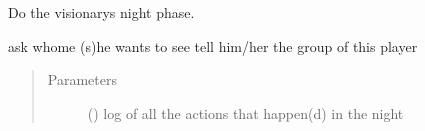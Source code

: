 \documentclass[letterpaper,10pt,english]{sphinxmanual}
\begin{document}
\begin{fulllineitems}
\begin{fulllineitems}
Do the visionarys night phase.

ask whome (s)he wants to see
tell him/her the group of this player
\begin{quote}\begin{description}
\item[{Parameters}] \leavevmode
{} ({\hyperref[\detokenize{chatwolf:chatwolf.nightactions.Nightactions}]{}}) \textendash{} log of all the actions that happen(d) in the night

\end{description}\end{quote}

\end{fulllineitems}


\end{fulllineitems}
\end{document}
